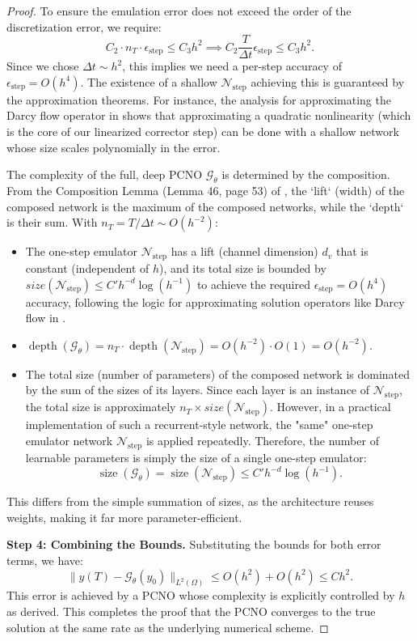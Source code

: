 \documentclass[pdflatex,sn-mathphys-num]{sn-jnl}%
\theoremstyle{thmstyleone}%
\numberwithin{equation}{section}
\begin{document}
\begin{proof}
To ensure the emulation error does not exceed the order of the discretization error, we require:
$$ C_2 \cdot n_T \cdot \epsilon_{\text{step}} \le C_3 h^2 \implies C_2 \frac{T}{\Delta t} \epsilon_{\text{step}} \le C_3 h^2. $$
Since we chose $\Delta t \sim h^2$, this implies we need a per-step accuracy of $\epsilon_{\text{step}} = O(h^4)$. The existence of a shallow $\mathcal{N}_{\text{step}}$ achieving this is guaranteed by the approximation theorems. For instance, the analysis for approximating the Darcy flow operator in \cite[Theorem 26]{kovachki2021universal} shows that approximating a quadratic nonlinearity (which is the core of our linearized corrector step) can be done with a shallow network whose size scales polynomially in the error.

The complexity of the full, deep PCNO $\mathcal{G}_\theta$ is determined by the composition. From the Composition Lemma (Lemma 46, page 53) of \cite{kovachki2021universal}, the `lift` (width) of the composed network is the maximum of the composed networks, while the `depth` is their sum. With $n_T = T/\Delta t \sim O(h^{-2})$:
\begin{itemize}
    \item The one-step emulator $\mathcal{N}_{\text{step}}$ has a lift (channel dimension) $d_v$ that is constant (independent of $h$), and its total size is bounded by $size(\mathcal{N}_{\text{step}}) \le C' h^{-d} \log(h^{-1})$ to achieve the required $\epsilon_{\text{step}}=O(h^4)$ accuracy, following the logic for approximating solution operators like Darcy flow in \cite[Theorem 26]{kovachki2021universal}.
    \item $\operatorname{depth}(\mathcal{G}_\theta) = n_T \cdot \operatorname{depth}(\mathcal{N}_{\text{step}}) = O(h^{-2}) \cdot O(1) = O(h^{-2})$.
    \item The total size (number of parameters) of the composed network is dominated by the sum of the sizes of its layers. Since each layer is an instance of $\mathcal{N}_{\text{step}}$, the total size is approximately $n_T \times size(\mathcal{N}_{\text{step}})$. However, in a practical implementation of such a recurrent-style network, the "same" one-step emulator network $\mathcal{N}_{\text{step}}$ is applied repeatedly. Therefore, the number of learnable parameters is simply the size of a single one-step emulator:
    $$\operatorname{size}(\mathcal{G}_\theta) = \operatorname{size}(\mathcal{N}_{\text{step}}) \le C' h^{-d} \log(h^{-1}).$$
\end{itemize}
This differs from the simple summation of sizes, as the architecture reuses weights, making it far more parameter-efficient.

\textbf{Step 4: Combining the Bounds.}
Substituting the bounds for both error terms, we have:
$$ \| y(T) - \mathcal{G}_\theta(y_0) \|_{L^2(\Omega)} \le O(h^2) + O(h^2) \le C h^2. $$
This error is achieved by a PCNO whose complexity is explicitly controlled by $h$ as derived. This completes the proof that the PCNO converges to the true solution at the same rate as the underlying numerical scheme.
\end{proof}
\end{document}
